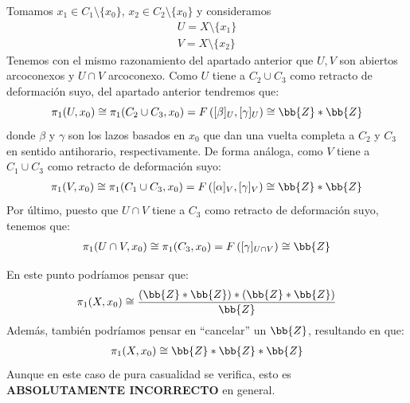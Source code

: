 \begin{ejemplo}
\begin{enumerate}
        Tomamos $x_1\in C_1\setminus\{x_0\}$, $x_2\in C_2\setminus \{x_0\}$ y consideramos 
        \begin{gather*}
            U=X\setminus \{x_1\}\\
            V = X \setminus \{x_2\}
        \end{gather*}
        Tenemos con el mismo razonamiento del apartado anterior que $U,V$ son abiertos arcoconexos y $U\cap V$ arcoconexo. Como $U$ tiene a $C_2\cup C_3$ como retracto de deformación suyo, del apartado anterior tendremos que:
        \begin{equation*}
            \pi_1(U,x_0) \cong \pi_1(C_2\cup C_3, x_0) = F\left([\beta]_U, [\gamma]_U\right) \cong \bb{Z} \ast \bb{Z}
        \end{equation*}
        donde $\beta$ y $\gamma$ son los lazos basados en $x_0$ que dan una vuelta completa a $C_2$ y $C_3$ en sentido antihorario, respectivamente. De forma análoga, como $V$ tiene a $C_1\cup C_3$ como retracto de deformación suyo:
        \begin{gather*}
            \pi_1(V,x_0) \cong \pi_1(C_1\cup C_3, x_0) = F\left([\alpha]_V, [\gamma]_V\right) \cong \bb{Z} \ast \bb{Z}
        \end{gather*}
        Por último, puesto que $U\cap V$ tiene a $C_3$ como retracto de deformación suyo, tenemos que:
        \begin{gather*}
            \pi_1(U\cap V, x_0) \cong \pi_1(C_3, x_0) = F\left([\gamma]_{U\cap V}\right) \cong \bb{Z}
        \end{gather*}

        En este punto podríamos pensar que:
        \begin{gather*}
            \pi_1(X,x_0) \cong \frac{(\bb{Z}\ast \bb{Z}) \ast (\bb{Z} \ast \bb{Z})}{\bb{Z}}
        \end{gather*} 
        Además, también podríamos pensar en ``cancelar'' un $\bb{Z}$, resultando en que: 
        \begin{gather*}
            \pi_1(X,x_0) \cong \bb{Z} \ast \bb{Z} \ast \bb{Z}
        \end{gather*} 
        Aunque en este caso de pura casualidad se verifica, esto es \textbf{ABSOLUTAMENTE INCORRECTO} en general.\\


\end{enumerate}
\end{ejemplo}
